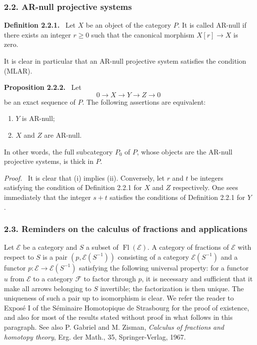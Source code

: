 \documentclass[11pt]{article}
\newenvironment{statement}[1]{\par\medskip\noindent\textbf{#1.}\ }{\par\medskip}
\newenvironment{prooftext}[1][Proof]{\par\noindent\emph{#1.}\ }{\par\medskip}
\providecommand{\Fl}{\operatorname{Fl}}
\providecommand{\cE}{\mathcal E}
\providecommand{\cF}{\mathcal F}
\begin{document}
\subsubsection*{2.2. AR-null projective systems}
\begin{statement}{Definition 2.2.1}
Let $X$ be an object of the category $P$. It is called AR-null if there exists an integer $r\ge0$ such that the canonical morphism $X[r]\to X$ is zero.
\end{statement}
It is clear in particular that an AR-null projective system satisfies the condition (MLAR).

\begin{statement}{Proposition 2.2.2}
Let
\[
0\longrightarrow X\longrightarrow Y\longrightarrow Z\longrightarrow0
\]
be an exact sequence of $P$. The following assertions are equivalent:
\begin{enumerate}[label=(\roman*)]
\item $Y$ is AR-null;
\item $X$ and $Z$ are AR-null.
\end{enumerate}
In other words, the full subcategory $P_0$ of $P$, whose objects are the AR-null projective systems, is thick in $P$.
\end{statement}

\begin{prooftext}[Proof]
It is clear that (i) implies (ii). Conversely, let $r$ and $t$ be integers satisfying the condition of Definition 2.2.1 for $X$ and $Z$ respectively. One sees immediately that the integer $s+t$ satisfies the conditions of Definition 2.2.1 for $Y$.
\end{prooftext}

\subsubsection*{2.3. Reminders on the calculus of fractions and applications}
Let $\cE$ be a category and $S$ a subset of $\Fl(\cE)$. A category of fractions of $\cE$ with respect to $S$ is a pair $(p,\cE(S^{-1}))$ consisting of a category $\cE(S^{-1})$ and a functor $p:\cE\to\cE(S^{-1})$ satisfying the following universal property: for a functor $u$ from $\cE$ to a category $\cF$ to factor through $p$, it is necessary and sufficient that it make all arrows belonging to $S$ invertible; the factorization is then unique. The uniqueness of such a pair up to isomorphism is clear. We refer the reader to Exposé I of the Séminaire Homotopique de Strasbourg for the proof of existence, and also for most of the results stated without proof in what follows in this paragraph. See also P. Gabriel and M. Zisman, \emph{Calculus of fractions and homotopy theory}, Erg. der Math., 35, Springer-Verlag, 1967.
\end{document}
